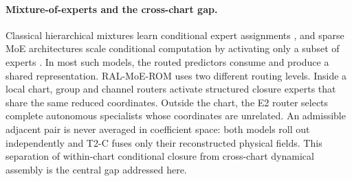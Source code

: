 \paragraph{Mixture-of-experts and the cross-chart gap.}
Classical hierarchical mixtures learn conditional expert assignments
\citep{jacobs1991,jordan1994}, and sparse MoE architectures scale conditional computation
by activating only a subset of experts \citep{shazeer2017,fedus2022}. In most such models,
the routed predictors consume and produce a shared representation. RAL-MoE-ROM uses two
different routing levels. Inside a local chart, group and channel routers activate
structured closure experts that share the same reduced coordinates. Outside the chart,
the E2 router selects complete autonomous specialists whose coordinates are unrelated.
An admissible adjacent pair is never averaged in coefficient space: both models roll out
independently and T2-C fuses only their reconstructed physical fields. This separation of
within-chart conditional closure from cross-chart dynamical assembly is the central gap
addressed here.
